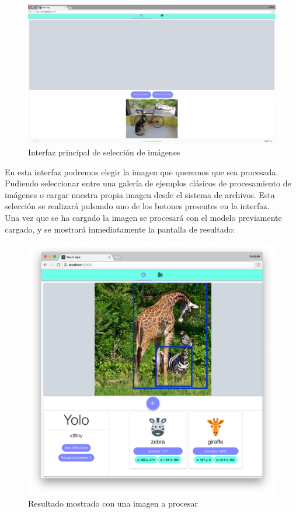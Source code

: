\documentclass[a4paper]{article}
\begin{document}
\begin{figure}[ht]
    \centering
    \includegraphics[scale=0.15]{images/image-selection.png}
    \caption{Interfaz principal de selección de imágenes}
    \label{fig:my_label}
\end{figure}

En esta interfaz podremos elegir la imagen que queremos que sea procesada. Pudiendo seleccionar entre 
una galería de ejemplos clásicos de procesamiento de imágenes o cargar nuestra propia imagen desde el 
sistema de archivos. Esta selección se realizará pulsando uno de los botones presentes en la 
interfaz.\\

Una vez que se ha cargado la imagen se procesará con el modelo previamente cargado, y se mostrará 
inmediatamente la pantalla de resultado:

\begin{figure}[ht]
    \centering
    \includegraphics[scale=0.3]{images/result-1.png}
    \caption{Resultado mostrado con una imagen a procesar}
    \label{fig:my_label}
\end{figure}
\end{document}

